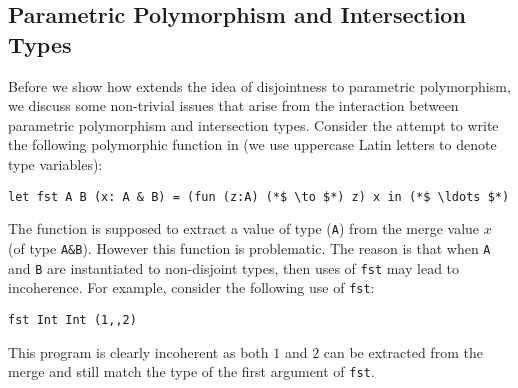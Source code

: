 \subsection{Parametric Polymorphism and Intersection Types}\label{subsec:polymorphism}
Before we show how \namedis extends the idea of disjointness to parametric
polymorphism, we discuss some non-trivial issues that arise from
the interaction between parametric polymorphism and intersection types.
Consider the attempt to write
the following polymorphic function in \namedis (we use
uppercase Latin letters to denote type variables):
\begin{lstlisting}
let fst A B (x: A & B) = (fun (z:A) (*$ \to $*) z) x in (*$ \ldots $*)
\end{lstlisting}
The
 function is supposed to extract a value of type
(\lstinline{A}) from the merge value $x$ (of type \lstinline{A&B}). However
this function is problematic.  The reason is that when
\lstinline{A} and \lstinline{B} are instantiated to non-disjoint
types, then uses of \lstinline{fst} may lead to incoherence.
For example, consider the following use of \lstinline{fst}:
\begin{lstlisting}
fst Int Int (1,,2)
\end{lstlisting}
\noindent This program is clearly incoherent as both
$1$ and $2$ can be extracted from the merge and still match the type
of the first argument of \lstinline{fst}.

